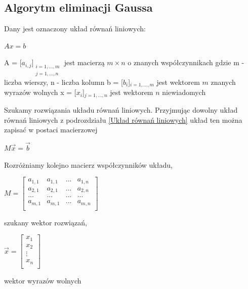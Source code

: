 \documentclass{article}
\begin{document}
\subsection{Algorytm eliminacji Gaussa}
\large{Dany jest oznaczony układ równań liniowych:
\begin{center}
    $Ax = b$
\end{center}
A = [$a_{i,j}$]$_\substack{{i=1,...,m}\\{j=1,...,n}}$ jest macierzą $m \times n$ o znanych współczynnikach gdzie m - liczba wierszy, n - liczba kolumn\newline
b = [$b_{i}$]$_{i=1,...,m}$ jest wektorem $m$ znanych wyrazów wolnych \newline
x = [$x_{i}$]$_{j=1,...,n}$ jest wektorem $n$ niewiadomych
}
Szukamy rozwiązania układu równań liniowych. Przyjmując dowolny układ równań liniowych z podrozdziału \ref{Układ równań liniowych} układ ten można zapisać w postaci macierzowej
\begin{center}
    \begin{math}
    M\overrightarrow{x}=\overrightarrow{b}
    \end{math}
\end{center}
\newpage
Rozróżniamy kolejno macierz współczynników układu, 
\begin{center}
    \begin{math}
    M=
    \left[
  \begin{matrix}
    a_{1,1} & a_{1,1} & ... & a_{1,n} \\
    a_{2,1} & a_{2,1} & ... & a_{2,n} \\
    ... & ... & ... & ... \\
    a_{m,1} & a_{m,1} & ... & a_{m,n} \\
  \end{matrix}
  \right]
    \end{math}
\end{center}
szukany wektor rozwiązań,
\begin{center}
    \begin{math}
    \overrightarrow{x} =
    \left[
  \begin{matrix}
    x_{1}  \\
    x_{2}  \\
    \vdots   \\
    x_{n}  \\
  \end{matrix}
  \right]
    \end{math}
\end{center}
wektor wyrazów wolnych 
\end{document}
